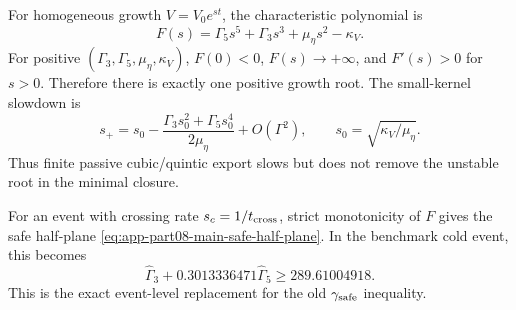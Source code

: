 For homogeneous growth \(V=V_0e^{st}\), the characteristic polynomial is
\begin{equation}
\label{eq:app-part08-stage251-characteristic}
F(s)=\Gamma_5s^5+\Gamma_3s^3+\mu_\eta s^2-\kappa_V.
\end{equation}
For positive \((\Gamma_3,\Gamma_5,\mu_\eta,\kappa_V)\), \(F(0)<0\), \(F(s)\to+\infty\), and \(F'(s)>0\) for \(s>0\).  Therefore there is exactly one positive growth root.  The small-kernel slowdown is
\begin{equation}
\label{eq:app-part08-stage251-small-kernel}
s_+=s_0-\frac{\Gamma_3s_0^2+\Gamma_5s_0^4}{2\mu_\eta}+O(\Gamma^2),
\qquad
s_0=\sqrt{\kappa_V/\mu_\eta}.
\end{equation}
Thus finite passive cubic/quintic export slows but does not remove the unstable root in the minimal closure.

For an event with crossing rate \(s_c=1/t_{\rm cross}\), strict monotonicity of \(F\) gives the safe half-plane \cref{eq:app-part08-main-safe-half-plane}.  In the benchmark cold event, this becomes
\begin{equation}
\label{eq:app-part08-stage251-benchmark-half-plane}
\widehat\Gamma_3+0.3013336471\widehat\Gamma_5\ge 289.61004918.
\end{equation}
This is the exact event-level replacement for the old \(\gamma_{\rm safe}\) inequality.
